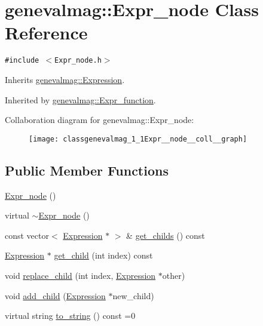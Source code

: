 \hypertarget{classgenevalmag_1_1Expr__node}{
\section{genevalmag::Expr\_\-node Class Reference}
\label{classgenevalmag_1_1Expr__node}
}
{\tt \#include $<$Expr\_\-node.h$>$}

Inherits \hyperlink{classgenevalmag_1_1Expression}{genevalmag::Expression}.

Inherited by \hyperlink{classgenevalmag_1_1Expr__function}{genevalmag::Expr\_\-function}.

Collaboration diagram for genevalmag::Expr\_\-node:\nopagebreak
\begin{figure}[H]
\begin{center}
\leavevmode
\texttt{[image: classgenevalmag\_1\_1Expr\_\_node\_\_coll\_\_graph]}
\end{center}
\end{figure}
\subsection*{Public Member Functions}
\begin{CompactItemize}
\item 
\hyperlink{classgenevalmag_1_1Expr__node_f8c84be806b49faef74651ec80f9d34d}{Expr\_\-node} ()
\item 
virtual \hyperlink{classgenevalmag_1_1Expr__node_ed3c4a68961a70c4f41bf100bfac7db9}{$\sim$Expr\_\-node} ()
\item 
const vector$<$ \hyperlink{classgenevalmag_1_1Expression}{Expression} $\ast$ $>$ \& \hyperlink{classgenevalmag_1_1Expr__node_35298ede3bb76a765ce4367a589383cc}{get\_\-childs} () const 
\item 
\hyperlink{classgenevalmag_1_1Expression}{Expression} $\ast$ \hyperlink{classgenevalmag_1_1Expr__node_fd22b5e20b8723e957587aafe4e8e724}{get\_\-child} (int index) const 
\item 
void \hyperlink{classgenevalmag_1_1Expr__node_951f8db517c231456781d10961ef8dba}{replace\_\-child} (int index, \hyperlink{classgenevalmag_1_1Expression}{Expression} $\ast$other)
\item 
void \hyperlink{classgenevalmag_1_1Expr__node_11c96ee7ecda3b52639b2f8879aafea2}{add\_\-child} (\hyperlink{classgenevalmag_1_1Expression}{Expression} $\ast$new\_\-child)
\item 
virtual string \hyperlink{classgenevalmag_1_1Expr__node_dea1d8fbc1b01f018e18cedad871f6a7}{to\_\-string} () const =0
\end{CompactItemize}
